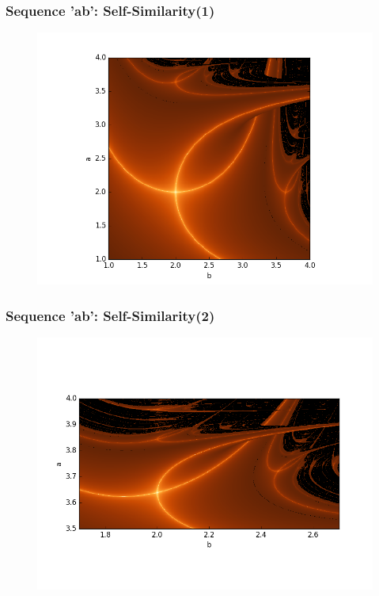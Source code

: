 \documentclass[ignorenonframetext]{beamer}
\begin{document}
\begin{frame}
\frametitle{Sequence 'ab': Self-Similarity(1)}
\begin{figure}[htbp]
\vspace*{5pt}
\includegraphics[scale = 0.5]{pictures/ab_selfsim_1.png}
\end{figure}
\end{frame}

\begin{frame}
\frametitle{Sequence 'ab': Self-Similarity(2)}
\begin{figure}[htbp]
\includegraphics[scale = 0.5]{pictures/ab_selfsim_2.png}
\end{figure}
\end{frame}

\begin{frame}
\\
\\
\end{frame}
\end{document}
